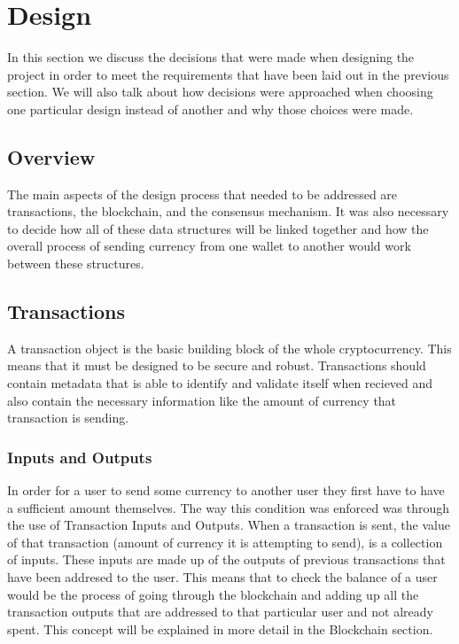 \documentclass{l4proj}
\begin{document}
\chapter{Design}
In this section we discuss the decisions that were made when designing the project in order to meet the requirements
that have been laid out in the previous section. We will also talk about how decisions were approached when
choosing one particular design instead of another and why those choices were made.

\section{Overview}
The main aspects of the design process that needed to be addressed are transactions, the blockchain, and
the consensus mechanism. It was also necessary to decide how all of these data structures will be linked together and
how the overall process of sending currency from one wallet to another would work between these structures.


\section{Transactions}
A transaction object is the basic building block of the whole cryptocurrency. This means that it must be designed 
to be secure and robust. Transactions should contain metadata that is able to identify and validate itself when
recieved and also contain the necessary information like the amount of currency that transaction is sending.

\subsection{Inputs and Outputs}
In order for a user to send some currency to another user they first have to have a sufficient amount themselves. The
way this condition was enforced was through the use of Transaction Inputs and Outputs. When a transaction is
sent, the value of that transaction (amount of currency it is attempting to send), is a collection of inputs. These inputs
are made up of the outputs of previous transactions that have been addresed to the user. This means that to check the 
balance of a user would be the process of going through the blockchain and adding up all the transaction outputs that
are addressed to that particular user and not already spent. This concept will be explained in more detail in the Blockchain section.
\end{document}
